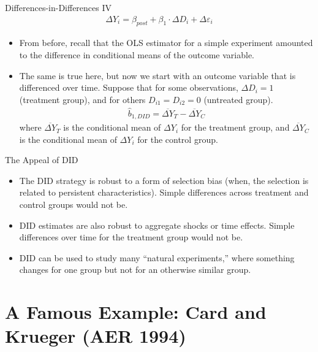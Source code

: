 \documentclass[aspectratio=169,11pt]{beamer}
\begin{document}
\begin{frame}{Differences-in-Differences IV}
\begin{align*}
  \Delta Y_{i}=\beta_{post} + \beta_{1} \cdot \Delta D_{i}+ \Delta \varepsilon_{i}
\end{align*}
\begin{itemize}
  \item From before, recall that the OLS estimator for a simple experiment
  amounted to the difference in conditional means of the outcome variable.

  \medskip
  \item The same is true here, but now we start with an outcome variable that
  is differenced over time. Suppose that for some observations, $\Delta D_{i}=1$
  (treatment group), and for others $D_{i1}=D_{i2}=0$ (untreated group).
  \begin{align*}
\hat{b}_{1,DID}=\overline{\Delta Y}_{T}-\overline{\Delta Y}_{C}
\end{align*}
where $\overline{\Delta Y}_{T}$ is the conditional mean of $\Delta Y_{i}$
for the treatment group, and $\overline{\Delta Y}_{C}$ is the conditional
mean of $\Delta Y_{i}$ for the control group.

\end{itemize}
\end{frame}


\begin{frame}{The Appeal of DID}
\begin{itemize}
  \item The DID strategy is robust to a form of selection bias
  (when, the selection is related to persistent characteristics).
  Simple differences across treatment and control groups would not be.

  \medskip
  \item DID estimates are also robust to aggregate shocks or time effects. Simple differences
  over time for the treatment group would not be.

  \medskip
  \item DID can be used to study many ``natural experiments,'' where something
  changes for one group but not for an otherwise similar group.

\end{itemize}
\end{frame}

\section{A Famous Example: Card and Krueger (AER 1994)}
\end{document}
